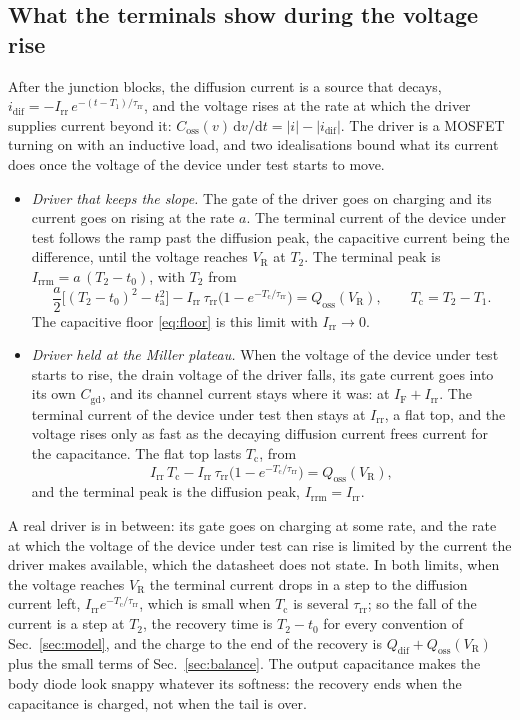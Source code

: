 \documentclass[10pt,a4paper]{scrartcl}
\newcommand{\IF}{I_\mathrm{F}}
\newcommand{\VR}{V_\mathrm{R}}
\newcommand{\Irr}{I_\mathrm{rr}}
\newcommand{\Irrm}{I_\mathrm{rrm}}
\newcommand{\Qdif}{Q_\mathrm{dif}}
\newcommand{\Qoss}{Q_\mathrm{oss}}
\newcommand{\Coss}{C_\mathrm{oss}}
\newcommand{\Cgd}{C_\mathrm{gd}}
\newcommand{\ta}{t_\mathrm{a}}
\newcommand{\Tc}{T_\mathrm{c}}
\newcommand{\taurr}{\tau_\mathrm{rr}}
\newcommand{\Tone}{T_1}
\newcommand{\Ttwo}{T_2}
\newcommand{\idif}{i_\mathrm{dif}}
\newcommand{\diff}{\mathrm{d}}
\begin{document}
\subsection{What the terminals show during the voltage rise}
\label{sec:terminals}
After the junction blocks, the diffusion current is a source that decays, $\idif = -\Irr\,e^{-(t-\Tone)/\taurr}$, and the voltage rises at the rate at which the driver supplies current beyond it: $\Coss(v)\,\diff v/\diff t = |i| - |\idif|$. The driver is a MOSFET turning on with an inductive load, and two idealisations bound what its current does once the voltage of the device under test starts to move.
\begin{itemize}
\item \emph{Driver that keeps the slope.} The gate of the driver goes on charging and its current goes on rising at the rate $a$. The terminal current of the device under test follows the ramp past the diffusion peak, the capacitive current being the difference, until the voltage reaches $\VR$ at $\Ttwo$. The terminal peak is $\Irrm = a\,(\Ttwo - t_0)$, with $\Ttwo$ from
\begin{equation}
\frac{a}{2}\bigl[(\Ttwo - t_0)^2 - \ta^2\bigr] - \Irr\,\taurr\bigl(1 - e^{-\Tc/\taurr}\bigr) = \Qoss(\VR) , \qquad \Tc = \Ttwo - \Tone .
\label{eq:rampdriver}
\end{equation}
The capacitive floor \eqref{eq:floor} is this limit with $\Irr \to 0$.
\item \emph{Driver held at the Miller plateau.} When the voltage of the device under test starts to rise, the drain voltage of the driver falls, its gate current goes into its own $\Cgd$, and its channel current stays where it was: at $\IF + \Irr$. The terminal current of the device under test then stays at $\Irr$, a flat top, and the voltage rises only as fast as the decaying diffusion current frees current for the capacitance. The flat top lasts $\Tc$, from
\begin{equation}
\Irr\,\Tc - \Irr\,\taurr\bigl(1 - e^{-\Tc/\taurr}\bigr) = \Qoss(\VR) ,
\label{eq:plateaudriver}
\end{equation}
and the terminal peak is the diffusion peak, $\Irrm = \Irr$.
\end{itemize}
A real driver is in between: its gate goes on charging at some rate, and the rate at which the voltage of the device under test can rise is limited by the current the driver makes available, which the datasheet does not state. In both limits, when the voltage reaches $\VR$ the terminal current drops in a step to the diffusion current left, $\Irr e^{-\Tc/\taurr}$, which is small when $\Tc$ is several $\taurr$; so the fall of the current is a step at $\Ttwo$, the recovery time is $\Ttwo - t_0$ for every convention of Sec.~\ref{sec:model}, and the charge to the end of the recovery is $\Qdif + \Qoss(\VR)$ plus the small terms of Sec.~\ref{sec:balance}. The output capacitance makes the body diode look snappy whatever its softness: the recovery ends when the capacitance is charged, not when the tail is over.
\end{document}
